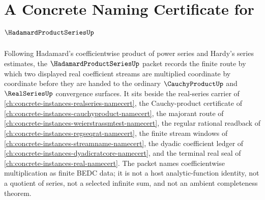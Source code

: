 \chapter{A Concrete Naming Certificate for $\HadamardProductSeriesUp$}
\label{ch:concrete-instances-hadamard-product-series-namecert}

Following Hadamard's coefficientwise product of power series and Hardy's
series estimates, the $\HadamardProductSeriesUp$ packet records the finite
route by which two displayed real coefficient streams are multiplied
coordinate by coordinate before they are handed to the ordinary
$\CauchyProductUp$ and $\RealSeriesUp$ convergence surfaces. It sits beside
the real-series carrier of \autoref{ch:concrete-instances-realseries-namecert},
the Cauchy-product certificate of \autoref{ch:concrete-instances-cauchyproduct-namecert},
the majorant route of \autoref{ch:concrete-instances-weierstrassmtest-namecert},
the regular rational readback of \autoref{ch:concrete-instances-regseqrat-namecert},
the finite stream windows of \autoref{ch:concrete-instances-streamname-namecert},
the dyadic coefficient ledger of \autoref{ch:concrete-instances-dyadicratcore-namecert},
and the terminal real seal of \autoref{ch:concrete-instances-real-namecert}.
The packet names coefficientwise multiplication as finite BEDC data; it is
not a host analytic-function identity, not a quotient of series, not a
selected infinite sum, and not an ambient completeness theorem.

